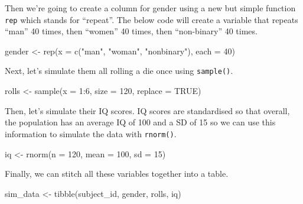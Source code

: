 \documentclass[
  oneside]{book}
\newenvironment{Shaded}{\begin{snugshade}}{\end{snugshade}}
\newcommand{\AttributeTok}[1]{\textcolor[rgb]{0.77,0.63,0.00}{#1}}
\newcommand{\ConstantTok}[1]{\textcolor[rgb]{0.00,0.00,0.00}{#1}}
\newcommand{\DecValTok}[1]{\textcolor[rgb]{0.00,0.00,0.81}{#1}}
\newcommand{\FunctionTok}[1]{\textcolor[rgb]{0.00,0.00,0.00}{#1}}
\newcommand{\NormalTok}[1]{#1}
\newcommand{\OtherTok}[1]{\textcolor[rgb]{0.56,0.35,0.01}{#1}}
\newcommand{\SpecialCharTok}[1]{\textcolor[rgb]{0.00,0.00,0.00}{#1}}
\newcommand{\StringTok}[1]{\textcolor[rgb]{0.31,0.60,0.02}{#1}}
\begin{document}
Then we're going to create a column for gender using a new but simple function \texttt{rep} which stands for ``repeat''. The below code will create a variable that repeats ``man'' 40 times, then ``women'' 40 times, then ``non-binary'' 40 times.

\begin{Shaded}
\begin{Highlighting}[]
\NormalTok{gender }\OtherTok{\textless{}{-}} \FunctionTok{rep}\NormalTok{(}\AttributeTok{x =} \FunctionTok{c}\NormalTok{(}\StringTok{"man"}\NormalTok{, }\StringTok{"woman"}\NormalTok{, }\StringTok{"nonbinary"}\NormalTok{), }\AttributeTok{each =} \DecValTok{40}\NormalTok{)}
\end{Highlighting}
\end{Shaded}

Next, let's simulate them all rolling a die once using \texttt{sample()}.

\begin{Shaded}
\begin{Highlighting}[]
\NormalTok{rolls }\OtherTok{\textless{}{-}} \FunctionTok{sample}\NormalTok{(}\AttributeTok{x =} \DecValTok{1}\SpecialCharTok{:}\DecValTok{6}\NormalTok{, }\AttributeTok{size =} \DecValTok{120}\NormalTok{, }\AttributeTok{replace =} \ConstantTok{TRUE}\NormalTok{)}
\end{Highlighting}
\end{Shaded}

Then, let's simulate their IQ scores. IQ scores are standardised so that overall, the population has an average IQ of 100 and a SD of 15 so we can use this information to simulate the data with \texttt{rnorm()}.

\begin{Shaded}
\begin{Highlighting}[]
\NormalTok{iq }\OtherTok{\textless{}{-}} \FunctionTok{rnorm}\NormalTok{(}\AttributeTok{n =} \DecValTok{120}\NormalTok{, }\AttributeTok{mean =} \DecValTok{100}\NormalTok{, }\AttributeTok{sd =} \DecValTok{15}\NormalTok{)}
\end{Highlighting}
\end{Shaded}

Finally, we can stitch all these variables together into a table.

\begin{Shaded}
\begin{Highlighting}[]
\NormalTok{sim\_data }\OtherTok{\textless{}{-}} \FunctionTok{tibble}\NormalTok{(subject\_id, gender, rolls, iq)}
\end{Highlighting}
\end{Shaded}
\end{document}
